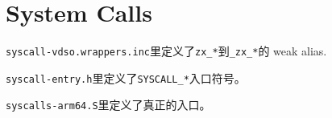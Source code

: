 \section{System Calls}

\verb|syscall-vdso.wrappers.inc|里定义了\verb|zx_*|到\verb|_zx_*|的
weak alias.

\verb|syscall-entry.h|里定义了\verb|SYSCALL_*|入口符号。

\verb|syscalls-arm64.S|里定义了真正的入口。

